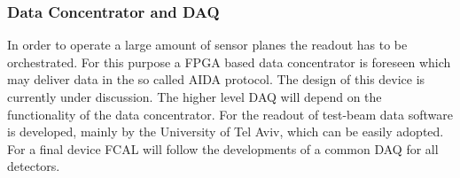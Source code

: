 \subsubsection{Data Concentrator and DAQ}
In order to operate a large amount of sensor planes the readout has to be orchestrated.
For this purpose a FPGA based data concentrator is foreseen
which may deliver data in the so called AIDA protocol. The design of this device is currently under discussion.
The higher level DAQ will depend on the functionality of the data concentrator.
For the readout of test-beam data  software is developed, mainly by the University of Tel Aviv,
which can be easily adopted.
For a final device FCAL will follow the developments of a common DAQ for all detectors.
